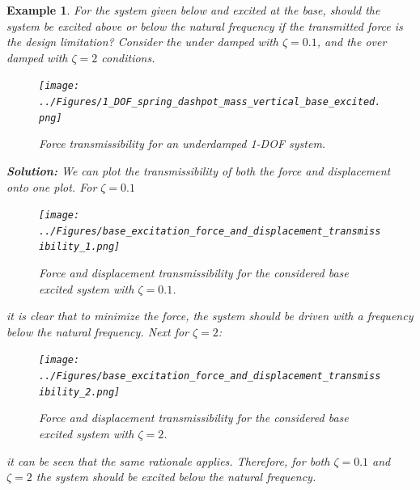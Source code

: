 \documentclass[12pt,letter]{article}
\newtheorem{ex}{Example}
\numberwithin{ex}{section} %
\newenvironment{example}{\begin{mdframed}[middlelinewidth=0.5mm]\begin{ex}\normalfont}{\end{ex}\end{mdframed}}
\numberwithin{re}{section} %
\begin{document}
				\begin{example}
					
					For the system given below and excited at the base, should the system be excited above or below the natural frequency if the transmitted force is the design limitation? Consider the under damped with $\zeta=0.1$, and the over damped with $\zeta=2$ conditions. 
		
					\begin{figure}[H]
						\centering
						\texttt{[image: ../Figures/1\_DOF\_spring\_dashpot\_mass\_vertical\_base\_excited.png]}
						\caption{Force transmissibility for an underdamped 1-DOF system.}
					\end{figure}		
				
					\noindent\textbf{Solution:} We can plot the transmissibility of both the force and displacement onto one plot. For $\zeta=0.1$
					\begin{figure}[H]
						\centering
						\texttt{[image: ../Figures/base\_excitation\_force\_and\_displacement\_transmissibility\_1.png]}
						\caption{Force and displacement transmissibility for the considered base excited system with $\zeta=0.1$.}
					\end{figure}
					it is clear that to minimize the force, the system should be driven with a frequency below the natural frequency. Next for  $\zeta=2$:
					\begin{figure}[H]
						\centering
						\texttt{[image: ../Figures/base\_excitation\_force\_and\_displacement\_transmissibility\_2.png]}
						\caption{Force and displacement transmissibility for the considered base excited system with $\zeta=2$.}
					\end{figure}			
					it can be seen that the same rationale applies. Therefore, for both $\zeta=0.1$ and $\zeta=2$ the system should be excited below the natural frequency.
				
				\end{example}
	
			
							
\end{document}
